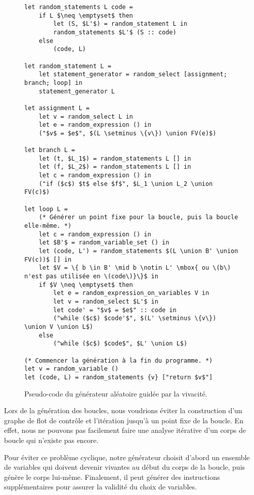 \documentclass[a4paper]{easychair}
\def\union{\cup}
\begin{document}
\begin{figure}
\begin{lstlisting}
let random_statements L code =
    if L $\neq \emptyset$ then
        let (S, $L'$) = random_statement L in
        random_statements $L'$ (S :: code)
    else
        (code, L)

let random_statement L =
    let statement_generator = random_select [assignment; branch; loop] in
    statement_generator L

let assignment L =
    let v = random_select L in
    let e = random_expression () in
    ("$v$ = $e$", $(L \setminus \{v\}) \union FV(e)$)

let branch L =
    let (t, $L_1$) = random_statements L [] in
    let (f, $L_2$) = random_statements L [] in
    let c = random_expression () in
    ("if ($c$) $t$ else $f$", $L_1 \union L_2 \union FV(c)$)

let loop L =
    (* Générer un point fixe pour la boucle, puis la boucle elle-même. *)
    let c = random_expression () in
    let $B'$ = random_variable_set () in
    let (code, L') = random_statements $(L \union B' \union FV(c))$ [] in
    let $V = \{ b \in B' \mid b \notin L' \mbox{ ou \(b\) n'est pas utilisée en \(code\)}\}$ in
    if $V \neq \emptyset$ then
        let e = random_expression_on_variables V in
        let v = random_select $L'$ in
        let code' = "$v$ = $e$" :: code in
        ("while ($c$) $code'$", $(L' \setminus \{v\}) \union V \union L$)
    else
        ("while ($c$) $code$", $L' \union L$)

(* Commencer la génération à la fin du programme. *)
let v = random_variable ()
let (code, L) = random_statements {v} ["return $v$"]
\end{lstlisting}
\caption{Pseudo-code du générateur aléatoire guidée par la vivacité.}
\label{fig:generator}
\end{figure}

Lors de la génération des boucles, nous voudrions éviter la construction
d'un graphe de flot de contrôle et l'itération jusqu'à un point fixe de la
boucle. En effet, nous ne pouvons pas facilement faire une analyse itérative
d'un corps de boucle qui n'existe pas encore.

Pour éviter ce problème cyclique, notre générateur choisit d'abord un
ensemble de variables qui doivent devenir vivantes au début du corps de la
boucle, puis génère le corps lui-même. Finalement, il peut générer des
instructions supplémentaires pour assurer la validité du choix de variables.
\end{document}
